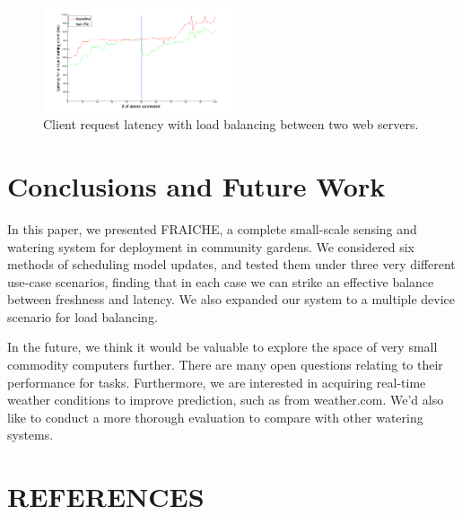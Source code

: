 \documentclass[a4paper]{acm_proc_article-sp}
\begin{document}
\begin{figure}
  \centering
      \includegraphics[width=0.5\textwidth]{two_pis.png}
  \caption{\label{fig:parallel_result}Client request latency with load balancing between two web servers.}
\end{figure}

\section{Conclusions and Future Work}

In this paper, we presented FRAICHE, a complete small-scale sensing and watering system for deployment in community gardens.  We considered six methods of scheduling model updates, and tested them under three very different use-case scenarios, finding that in each case we can strike an effective balance between freshness and latency. We also expanded our system to a multiple device scenario for load balancing.

In the future, we think it would be valuable to explore the space of very small commodity computers further.  There are many open questions relating to their performance for tasks. Furthermore, we are interested in acquiring real-time weather conditions to improve prediction, such as from weather.com. We'd also like to conduct a more thorough evaluation to compare with other watering systems.


\section{REFERENCES}




\end{document}
